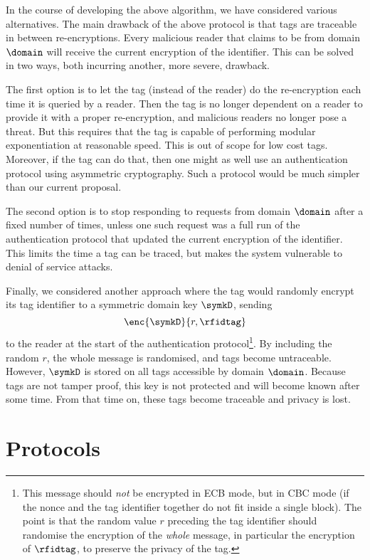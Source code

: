In the course of developing the above algorithm, we have considered various
alternatives. The main drawback of the above protocol is that tags are
traceable in between re-encryptions. Every malicious reader that claims to be
from domain $\domain$ will receive the current encryption of the
identifier. This can be solved in two ways, both incurring another, more
severe, drawback.

The first option is to let the tag (instead of the reader) do the re-encryption
each time it is queried by a reader. Then the tag is no longer dependent on a
reader to provide it with a proper re-encryption, and malicious readers no longer
pose a threat. But this requires that the tag is capable of performing modular
exponentiation at reasonable speed. This is out of scope for low cost
tags. Moreover, if the tag can do that, then one might as well use an
authentication protocol using asymmetric cryptography. Such a protocol would be
much simpler than our current proposal.

The second option is to stop responding to requests from domain $\domain$ after
a fixed number of times, unless one such request was a full run of the
authentication protocol that updated the current encryption of the
identifier. This limits the time a tag can be traced, but
makes the system vulnerable to denial of service attacks.

Finally, we considered another approach where the tag would randomly encrypt
its tag identifier to a symmetric domain key $\symkD$, sending
\[
\enc{\symkD}{r,\rfidtag}
\]
to the reader at the start of the authentication protocol\footnote{This message should \emph{not} be encrypted in ECB mode, but in CBC
	mode (if the nonce and the tag identifier together do not fit
	inside a single block). The point is that the random value $r$
	preceding the tag identifier should randomise the encryption of the
	\emph{whole} message, in particular the encryption of $\rfidtag$, to  
	preserve the privacy of the tag.
}. By including the
random $r$, the whole message is randomised, and tags become
untraceable. However, $\symkD$ is stored on all tags accessible by domain
$\domain$. Because tags are not tamper proof, this key is not protected and will
become known after some time. From that time on, these tags become traceable
and privacy is lost.



\section{Protocols}
\label{sec-prot}

